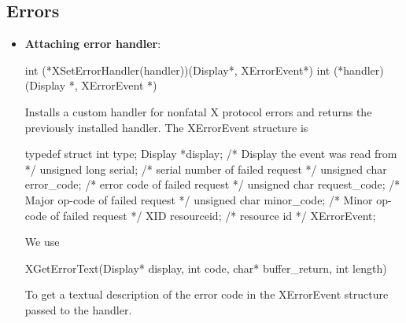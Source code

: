\documentclass{report}
\begin{document}
    \pagebreak 
    \subsection{Errors}
    \begin{itemize}
        \item \textbf{Attaching error handler}: 
            \bigbreak \noindent 
            \begin{cppcode}
                int (*XSetErrorHandler(handler))(Display*, XErrorEvent*)
                    int (*handler)(Display *, XErrorEvent *)
            \end{cppcode}
            \bigbreak \noindent
            Installs a custom handler for nonfatal X protocol errors and returns the previously installed handler.
            \bigbreak \noindent 
            The XErrorEvent structure is
            \bigbreak \noindent 
            \begin{cppcode}
                typedef struct {
                    int type;
                    Display *display;                   /* Display the event was read from */
                    unsigned long serial;               /* serial number of failed request */
                    unsigned char error_code;           /* error code of failed request */
                    unsigned char request_code;         /* Major op-code of failed request */
                    unsigned char minor_code;           /* Minor op-code of failed request */
                    XID resourceid;                     /* resource id */
                } XErrorEvent;
            \end{cppcode}
            \bigbreak \noindent 
            We use 
            \bigbreak \noindent 
            \begin{cppcode}
                XGetErrorText(Display* display, int code, char* buffer_return, int length)
            \end{cppcode}
            \bigbreak \noindent 
            To get a textual description of the error code in the XErrorEvent structure passed to the handler.

    \end{itemize}

    \pagebreak 
\end{document}
